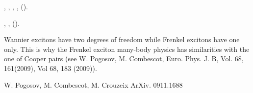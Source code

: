 \documentclass[aps,prb,superscriptaddress,twocolumn]{revtex4}
\begin{document}
\begin{thebibliography}{9}
,
  ,
   ,
   \textbf{},
   ().

 
  ,
  \textbf{},  ().
  
    Wannier excitons have two degrees of freedom while Frenkel excitons have one only. This is why the Frenkel exciton many-body physics has similarities with the one of Cooper pairs (see  W. Pogosov, M. Combescot, Euro. Phys. J. B, Vol. 68, 161(2009), Vol 68, 183 (2009)).
  
  



%
W. Pogosov, M. Combescot, M. Crouzeix ArXiv. 0911.1688
 
\end{thebibliography}
\end{document}
